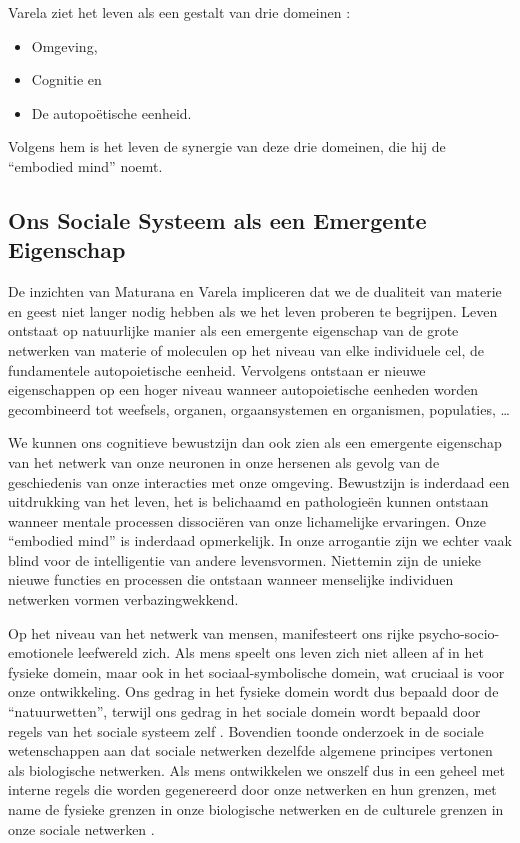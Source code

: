 \documentclass[
  11pt,
]{book}
\providecommand{\tightlist}{%
  \setlength{\itemsep}{0pt}\setlength{\parskip}{0pt}}
\begin{document}
Varela ziet het leven als een gestalt van drie domeinen \citep{capraLuisi2014}:

\begin{itemize}
\tightlist
\item
  Omgeving,
\item
  Cognitie en
\item
  De autopoëtische eenheid.
\end{itemize}

Volgens hem is het leven de synergie van deze drie domeinen, die hij de ``embodied mind'' noemt.

\hypertarget{ons-sociale-systeem-als-een-emergente-eigenschap}{%
\subsection{Ons Sociale Systeem als een Emergente Eigenschap}\label{ons-sociale-systeem-als-een-emergente-eigenschap}}

De inzichten van Maturana en Varela impliceren dat we de dualiteit van materie en geest niet langer nodig hebben als we het leven proberen te begrijpen. Leven ontstaat op natuurlijke manier als een emergente eigenschap van de grote netwerken van materie of moleculen op het niveau van elke individuele cel, de fundamentele autopoietische eenheid. Vervolgens ontstaan er nieuwe eigenschappen op een hoger niveau wanneer autopoietische eenheden worden gecombineerd tot weefsels, organen, orgaansystemen en organismen, populaties, \ldots{}

We kunnen ons cognitieve bewustzijn dan ook zien als een emergente eigenschap van het netwerk van onze neuronen in onze hersenen als gevolg van de geschiedenis van onze interacties met onze omgeving. Bewustzijn is inderdaad een uitdrukking van het leven, het is belichaamd en pathologieën kunnen ontstaan wanneer mentale processen dissociëren van onze lichamelijke ervaringen. Onze ``embodied mind'' is inderdaad opmerkelijk. In onze arrogantie zijn we echter vaak blind voor de intelligentie van andere levensvormen. Niettemin zijn de unieke nieuwe functies en processen die ontstaan wanneer menselijke individuen netwerken vormen verbazingwekkend.

Op het niveau van het netwerk van mensen, manifesteert ons rijke psycho-socio-emotionele leefwereld zich. Als mens speelt ons leven zich niet alleen af in het fysieke domein, maar ook in het sociaal-symbolische domein, wat cruciaal is voor onze ontwikkeling. Ons gedrag in het fysieke domein wordt dus bepaald door de ``natuurwetten'', terwijl ons gedrag in het sociale domein wordt bepaald door regels van het sociale systeem zelf \citep{capraLuisi2014}. Bovendien toonde onderzoek in de sociale wetenschappen aan dat sociale netwerken dezelfde algemene principes vertonen als biologische netwerken. Als mens ontwikkelen we onszelf dus in een geheel met interne regels die worden gegenereerd door onze netwerken en hun grenzen, met name de fysieke grenzen in onze biologische netwerken en de culturele grenzen in onze sociale netwerken \citep{capraLuisi2014}.
\end{document}
